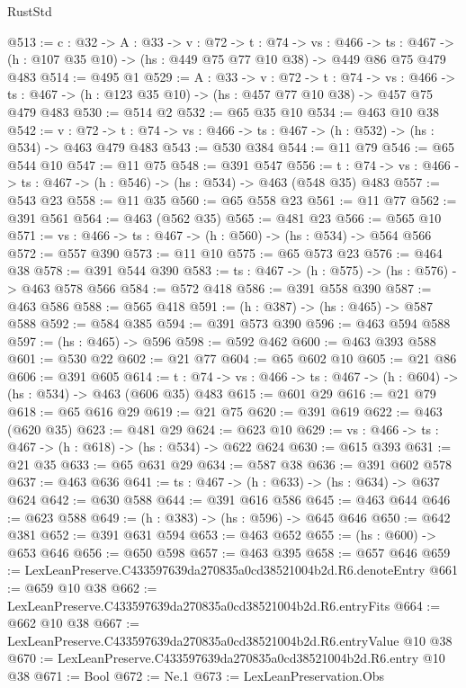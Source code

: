 \begin{lexlean}{RustStd}
\begin{coremodule}
@513 := {c : @32} ->
  {A : @33} ->
  {v : @72} ->
  {t : @74} ->
  {vs : @466} ->
  {ts : @467} -> (h : @107 @35 @10) -> (hs : @449 @75 @77 @10 @38) -> @449 @86 @75 @479 @483
@514 := @495 @1
@529 := {A : @33} ->
  {v : @72} ->
  {t : @74} ->
  {vs : @466} -> {ts : @467} -> (h : @123 @35 @10) -> (hs : @457 @77 @10 @38) -> @457 @75 @479 @483
@530 := @514 @2
@532 := @65 @35 @10
@534 := @463 @10 @38
@542 := {v : @72} ->
  {t : @74} -> {vs : @466} -> {ts : @467} -> (h : @532) -> (hs : @534) -> @463 @479 @483
@543 := @530 @384
@544 := @11 @79
@546 := @65 @544 @10
@547 := @11 @75
@548 := @391 @547
@556 := {t : @74} -> {vs : @466} -> {ts : @467} -> (h : @546) -> (hs : @534) -> @463 (@548 @35) @483
@557 := @543 @23
@558 := @11 @35
@560 := @65 @558 @23
@561 := @11 @77
@562 := @391 @561
@564 := @463 (@562 @35)
@565 := @481 @23
@566 := @565 @10
@571 := {vs : @466} -> {ts : @467} -> (h : @560) -> (hs : @534) -> @564 @566
@572 := @557 @390
@573 := @11 @10
@575 := @65 @573 @23
@576 := @464 @38
@578 := @391 @544 @390
@583 := {ts : @467} -> (h : @575) -> (hs : @576) -> @463 @578 @566
@584 := @572 @418
@586 := @391 @558 @390
@587 := @463 @586
@588 := @565 @418
@591 := (h : @387) -> (hs : @465) -> @587 @588
@592 := @584 @385
@594 := @391 @573 @390
@596 := @463 @594 @588
@597 := (hs : @465) -> @596
@598 := @592 @462
@600 := @463 @393 @588
@601 := @530 @22
@602 := @21 @77
@604 := @65 @602 @10
@605 := @21 @86
@606 := @391 @605
@614 := {t : @74} -> {vs : @466} -> {ts : @467} -> (h : @604) -> (hs : @534) -> @463 (@606 @35) @483
@615 := @601 @29
@616 := @21 @79
@618 := @65 @616 @29
@619 := @21 @75
@620 := @391 @619
@622 := @463 (@620 @35)
@623 := @481 @29
@624 := @623 @10
@629 := {vs : @466} -> {ts : @467} -> (h : @618) -> (hs : @534) -> @622 @624
@630 := @615 @393
@631 := @21 @35
@633 := @65 @631 @29
@634 := @587 @38
@636 := @391 @602 @578
@637 := @463 @636
@641 := {ts : @467} -> (h : @633) -> (hs : @634) -> @637 @624
@642 := @630 @588
@644 := @391 @616 @586
@645 := @463 @644
@646 := @623 @588
@649 := (h : @383) -> (hs : @596) -> @645 @646
@650 := @642 @381
@652 := @391 @631 @594
@653 := @463 @652
@655 := (hs : @600) -> @653 @646
@656 := @650 @598
@657 := @463 @395
@658 := @657 @646
@659 := LexLeanPreserve.C433597639da270835a0cd38521004b2d.R6.denoteEntry
@661 := @659 @10 @38
@662 := LexLeanPreserve.C433597639da270835a0cd38521004b2d.R6.entryFits
@664 := @662 @10 @38
@667 := LexLeanPreserve.C433597639da270835a0cd38521004b2d.R6.entryValue @10 @38
@670 := LexLeanPreserve.C433597639da270835a0cd38521004b2d.R6.entry @10 @38
@671 := Bool
@672 := Ne.{1}
@673 := LexLeanPreservation.Obs

\end{coremodule}
\end{lexlean}
